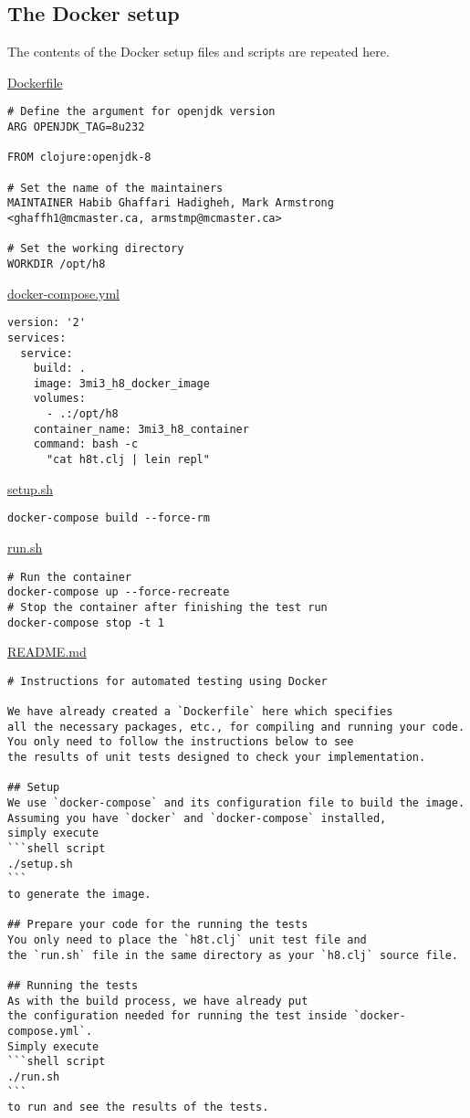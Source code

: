\documentclass[11pt]{article}
\begin{document}
\subsection*{The Docker setup}
\label{sec:org3eee9da}
The contents of the Docker setup files and scripts are repeated here.

\href{./testing/h7/Dockerfile}{Dockerfile}
\begin{verbatim}
# Define the argument for openjdk version
ARG OPENJDK_TAG=8u232

FROM clojure:openjdk-8
    
# Set the name of the maintainers
MAINTAINER Habib Ghaffari Hadigheh, Mark Armstrong <ghaffh1@mcmaster.ca, armstmp@mcmaster.ca>

# Set the working directory
WORKDIR /opt/h8
\end{verbatim}

\href{./testing/h7/docker-compose.yml}{docker-compose.yml}
\begin{verbatim}
version: '2'
services:
  service:
    build: .
    image: 3mi3_h8_docker_image
    volumes:
      - .:/opt/h8
    container_name: 3mi3_h8_container
    command: bash -c
      "cat h8t.clj | lein repl"
\end{verbatim}

\href{./testing/h5/setup.sh}{setup.sh}
\begin{verbatim}
docker-compose build --force-rm
\end{verbatim}

\href{./testing/h5/run.sh}{run.sh}
\begin{verbatim}
# Run the container
docker-compose up --force-recreate
# Stop the container after finishing the test run
docker-compose stop -t 1
\end{verbatim}

\href{./testing/h5/README.md}{README.md}
\begin{verbatim}
# Instructions for automated testing using Docker

We have already created a `Dockerfile` here which specifies
all the necessary packages, etc., for compiling and running your code.
You only need to follow the instructions below to see 
the results of unit tests designed to check your implementation.

## Setup
We use `docker-compose` and its configuration file to build the image.
Assuming you have `docker` and `docker-compose` installed,
simply execute
```shell script
./setup.sh
```
to generate the image.

## Prepare your code for the running the tests
You only need to place the `h8t.clj` unit test file and
the `run.sh` file in the same directory as your `h8.clj` source file.

## Running the tests
As with the build process, we have already put
the configuration needed for running the test inside `docker-compose.yml`.
Simply execute
```shell script
./run.sh
```
to run and see the results of the tests.
\end{verbatim}
\end{document}
